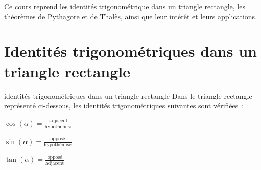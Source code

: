 \documentclass[12pt]{article}
\begin{document}







Ce cours reprend les identités trigonométrique dans un triangle rectangle, les théorèmes de Pythagore et de Thalès, ainsi que leur intérêt et leurs applications.
\section{Identités trigonométriques dans un triangle rectangle}
\begin{theoreme}{}{identités trigonométriques dans un triangle rectangle}
Dans le triangle rectangle représenté ci-dessous, les identités trigonométriques suivantes sont vérifiées~:
\begin{enumeratebf}
    \item $\cos(\alpha) = \frac{\text{adjacent}}{\text{hypothénuse}}$
    \item $\sin(\alpha) = \frac{\text{opposé}}{\text{hypothénuse}}$ 
    \item $\tan(\alpha) = \frac{\text{opposé}}{\text{adjacent}}$
\end{enumeratebf}

\begin{center}
\end{center}
\end{theoreme}
\end{document}
